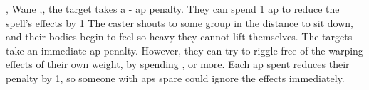   {\mEarth,\mFire}%
  {Wane}%
  {\detailed,\distant,\duplicated}%
  {}%
  {the target takes a - \gls{ap} penalty. They can spend 1 \gls{ap} to reduce the spell's effects by 1}%
  {
    The caster shouts to some group in the distance to sit down, and their bodies begin to feel so heavy they cannot lift themselves.
    The targets take an immediate  \gls{ap} penalty.
    However, they can try to riggle free of the warping effects of their own weight, by spending , or more.
    Each \gls{ap} spent reduces their penalty by 1, so someone with  \glspl{ap} spare could ignore the effects immediately.
  }

